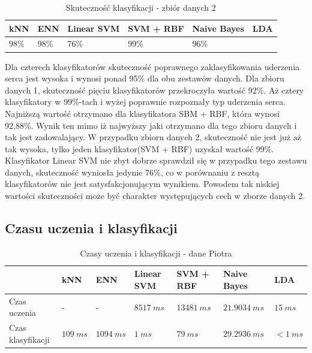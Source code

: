 \documentclass[[10pt,a4paper]{article}
\begin{document}
\begin{table}[h]
\centering
\caption{Skuteczność klasyfikacji - zbiór danych 2}
\label{accuracyTable1}
\begin{tabular}{|l|l|l|l|l|l|}
\hline
kNN & ENN & Linear SVM & SVM + RBF & Naive Bayes & LDA \\ \hline
  98\%   &  98\%  & 76\%       & 99\%      & 96\%        &     \\ \hline
\end{tabular}
\end{table}

Dla czterech klasyfikatorów skuteczność poprawnego zaklasyfikowania uderzenia serca jest wysoka i wynosi ponad 95\% dla obu zestawów danych. Dla zbioru danych 1,  skuteczność pięciu klasyfikatorów przekroczyła wartość 92\%.  Aż cztery klasyfikatory w 99\%-tach i wyżej poprawnie rozpoznały typ uderzenia serca. Najniższą wartość otrzymano dla klasyfikatora SBM + RBF, która wynosi 92,88\%. Wynik ten mimo iż najwyższy jaki otrzymano dla tego zbioru danych i tak jest zadowalający. W przypadku zbioru danych 2, skuteczność nie jest już aż tak wysoka, tylko jeden klasyfikator(SVM + RBF) uzyskał wartość 99\%. Klasyfikator Linear SVM nie zbyt dobrze sprawdził się w przypadku tego zestawu danych, skuteczność wyniosła jedynie 76\%, co w porównaniu z resztą klasyfikatorów nie jest satysfakcjonującym wynikiem. Powodem tak niskiej wartości skuteczności może być charakter występujących cech w zborze danych 2. 





\subsection{Czasu uczenia i klasyfikacji}

\begin{table}[h]
\centering
\caption{Czasy uczenia i klasyfikacji - dane Piotra}
\label{timesTable1}
\begin{tabular}{l|l|l|l|l|l|l|}
\cline{2-7}
                                        & kNN & ENN & Linear SVM & SVM + RBF & Naive Bayes & LDA \\ \hline
\multicolumn{1}{|l|}{Czas uczenia}      &  -  &  -   &  $8517\: ms$   &   $13481\: ms$   &   $21.9034\: ms$ & $15\: ms$    \\ \hline
\multicolumn{1}{|l|}{Czas klasyfikacji} &  $109 \: ms$   &   $1094\: ms$   &   $1\: ms$  &      $79\: ms$     &     $29.2936\: ms$        & $< 1\: ms$  \\ \hline
\end{tabular}
\end{table}
\end{document}
